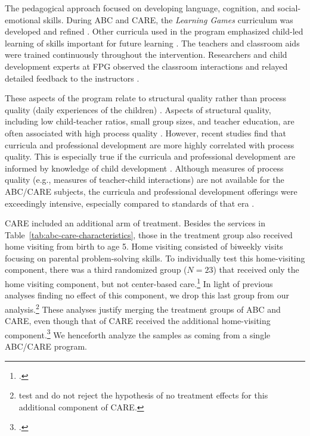 The pedagogical approach focused on developing language, cognition, and social-emotional skills. During ABC and CARE, the \textit{Learning Games} curriculum was developed and refined \citep{Sparling_Lewis_1979_BOOKLearninggamesFirstThree}. Other curricula used in the program emphasized child-led learning of skills important for future learning \citep{Conti_etal_2016_LongTermHealth}. The teachers and classroom aids were trained continuously throughout the intervention. Researchers and child development experts at FPG observed the classroom interactions and relayed detailed feedback to the instructors \citep{Ramey-etal_2012-ABC}. 

These aspects of the program relate to structural quality rather than process quality (daily experiences of the children) \citep{thomason2009measuring}. Aspects of structural quality, including low child-teacher ratios, small group sizes, and teacher education, are often associated with high process quality \citep{phillipsen1997prediction}. However, recent studies find that curricula and professional development are more highly correlated with process quality. This is especially true if the curricula and professional development are informed by knowledge of child development \citep{slot2015associations}. Although measures of process quality (e.g., measures of teacher-child interactions) are not available for the ABC/CARE subjects, the curricula and professional development offerings were exceedingly intensive, especially compared to standards of that era \citep{Ramey-etal_2012-ABC}. 

CARE included an additional arm of treatment. Besides the services in Table~\ref{tab:abc-care-characteristics}, those in the treatment group also received home visiting from birth to age 5. Home visiting consisted of biweekly visits focusing on parental problem-solving skills. To individually test this home-visiting component, there was a third randomized group ($N=23$) that received only the home visiting component, but not center-based care.\footnote{\citet{Wasik_Ramey_etal_1990_CD}.} In light of previous analyses finding no effect of this component, we drop this last group from our analysis.\footnote{\citet{Campbell_Conti_etal_2014_EarlyChildhoodInvestments} test and do not reject the hypothesis of no treatment effects for this additional component of CARE.} These analyses justify merging the treatment groups of ABC and CARE, even though that of CARE received the additional home-visiting component.\footnote{\citet{ABCCARE_Dataset}.} We henceforth analyze the samples as coming from a single ABC/CARE program.

